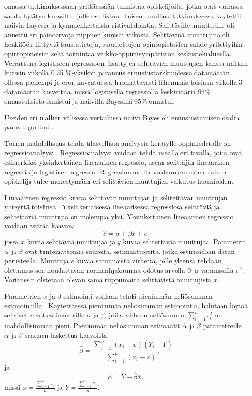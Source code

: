 \cite{barberCourseCorrectionUsing2012} omassa tutkimuksessaan yrittäessään tunnistaa opiskelijoita, jotka ovat vaarassa saada hylätyn kurssilta, jolle osallistuu. Toisena mallina tutkimuksessa käytettiin naiivia Bayesia ja kymmenkertaista ristivalidointia. Selittäville muuttujille oli annettu eri painoarvoja riippuen kurssin viikosta. Selittävinä muuttujina oli henkilöön liittyviä taustatietoja, suoritettujen opintopisteiden suhde yritettyihin opintopisteisiin sekä toimintaa verkko-oppimisympäristön keskustelualueella. Verrattuna logistiseen regressioon, lisättyjen selittävien muuttujien kanssa nähtiin kurssin viikolla 0 35 \%-yksikön parannus ennustustarkkuudessa datamäärän ollessa pienempi ja eron kaventuessa huomattavasti lähemmäs toisiaan viikolla 3 datamäärän kasvettua, missä logistisella regressiolla keskimäärin 94\% ennustuksista onnistui ja naiivilla Bayesillä 95\% onnistui.

\color{red}
Useiden eri mallien välisessä vertailussa naiivi Bayes oli ennustustamisen osalta paras algoritmi \citep{kotsiantisPREDICTINGSTUDENTSPERFORMANCE2004}.
\color{black}

Toinen mahdollisuus tehdä tilastollista analyysia kerätylle oppimisdatalle on regressioanalyysi \citep{songLearningAnalyticsEducational2018, romeroEducationalDataMining2010, papamitsiouLearningAnalyticsEducational2014}. Regressioanalyysi voidaan tehdä usealla eri tavalla, joita ovat esimerkiksi yksinkertainen lineaarinen regressio, usean selittäjän lineaarinen regressio ja logistinen regressio. Regression avulla voidaan ennustaa kuinka opiskelija tulee menestymään eri selittävien muuttujien vaikutus huomioiden.

Lineaarinen regressio kuvaa selittävän muuttujan ja selitettävän muuttujan yhteyttä toisiinsa \citep{rossIntroductoryStatistics2017}. Yksinkertaisessa lineaarisessa regressiosa selittäviä ja selitettäviä muuttujia on molempia yksi. Yksinkertainen lineaarinen regressio voidaan esittää kaavana $$Y = \alpha + \beta x + e,$$ jossa $x$ kuvaa selittävää muuttujaa ja $y$ kuvaa selitettävää muuttujaa. Parametrit $\alpha$ ja $\beta$ ovat tuntemattomia suureita, estimaattoreita, jotka estimoidaan datan perusteella.  Muuttuja $e$ kuvaa satunnaista virhettä, jolle yleensä tehdään olettamus sen noudattavan normaalijakaumaa odotus arvolla $0$ ja varianssilla $\sigma^2$. Varianssin oletetaan olevan sama riippumatta selittävistä muuttujista $x$.

Parametrien $\alpha$ ja $\beta$ estimointi voidaan tehdä pienimmän neliösumman estimoinnilla \citep{rossIntroductoryStatistics2017}. Käytettäessä pienimmän neliösumman estimointia, halutaan löytää sellaiset arvot estimaateille $\alpha$ ja $\beta$, joilla virheen neliösumma $\sum^n_{i=1} \epsilon^2_i$ on mahdollisimman pieni. Pienimmän neliösumman estimaatit $\hat{\alpha}$ ja $\hat{\beta}$ parametreille $\alpha$ ja $\beta$ saadaan laskettua kaavoista $$\hat{\beta} = \frac{\sum^n_{i=1}(x_i - \overline{x})(Y_i - \overline{Y})}{\sum^n_{i=1}(x_i - \overline{x})^2}$$ ja $$\hat{\alpha} = \overline{Y} - \hat{\beta}\overline{x},$$ missä $\overline{x} = \frac{\sum^n_{i=1}x_i}{n}$ ja $\overline{Y} = \frac{\sum^n_{i=1}Y_i}{n}$.

